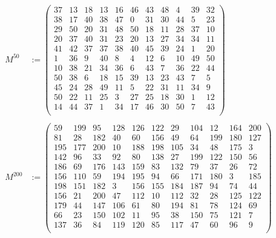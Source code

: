 \documentclass[twoside,11pt]{article}
\begin{document}
\begin{appendices}
  \begin{align*}
    M^{50} &:=
      \begin{pmatrix}
        37 &13 &18 &13 &16 &46 &43 &48 & 4 &39 &32 \\
        38 &17 &40 &38 &47 & 0 &31 &30 &44 & 5 &23 \\
        29 &50 &20 &31 &48 &50 &18 &11 &28 &37 &10 \\
        20 &37 &40 &31 &23 &20 &13 &27 &34 &34 &11 \\
        41 &42 &37 &37 &38 &40 &45 &39 &24 & 1 &20 \\
         1 &36 & 9 &40 & 8 & 4 &12 & 6 &10 &49 &50 \\
        10 &38 &21 &34 &36 & 6 &43 & 7 &36 &22 &44 \\
        50 &38 & 6 &18 &15 &39 &13 &23 &43 & 7 & 5 \\
        45 &24 &28 &49 &11 & 5 &22 &31 &11 &34 & 9 \\
        50 &22 &11 &25 & 3 &27 &25 &18 &30 & 1 &12 \\
        14 &44 &37 & 1 &34 &17 &46 &30 &50 & 7 &43 \\
      \end{pmatrix} \\ \\
    M^{200} &:=
      \begin{pmatrix}
         59 &199 & 95 &128 &126 &122 & 29 &104 & 12 &164 &200 \\
         81 & 28 &182 & 40 & 60 &156 & 49 & 64 &199 &180 &127 \\
        195 &177 &200 & 10 &188 &198 &105 & 34 & 48 &175 &  3 \\
        142 & 96 & 33 & 92 & 80 &138 & 27 &199 &122 &150 & 56 \\
        186 & 69 &176 &143 &159 & 83 &132 & 79 & 37 & 26 & 72 \\
        156 &110 & 59 &194 &195 & 94 & 66 &171 &180 &  3 &185 \\
        198 &151 &182 &  3 &156 &155 &184 &187 & 94 & 74 & 44 \\
        156 & 21 &200 & 47 &112 & 10 &112 & 32 & 28 &125 &122 \\
        179 & 44 &147 &106 & 61 & 80 &194 & 81 & 78 &124 & 69 \\
         66 & 23 &150 &102 & 11 & 95 & 38 &150 & 75 &121 &  7 \\
        137 & 36 & 84 &119 &120 & 85 &117 & 47 & 60 & 96 &  9 \\
      \end{pmatrix} \\ \\

\end{align*}
\end{appendices}
\end{document}
